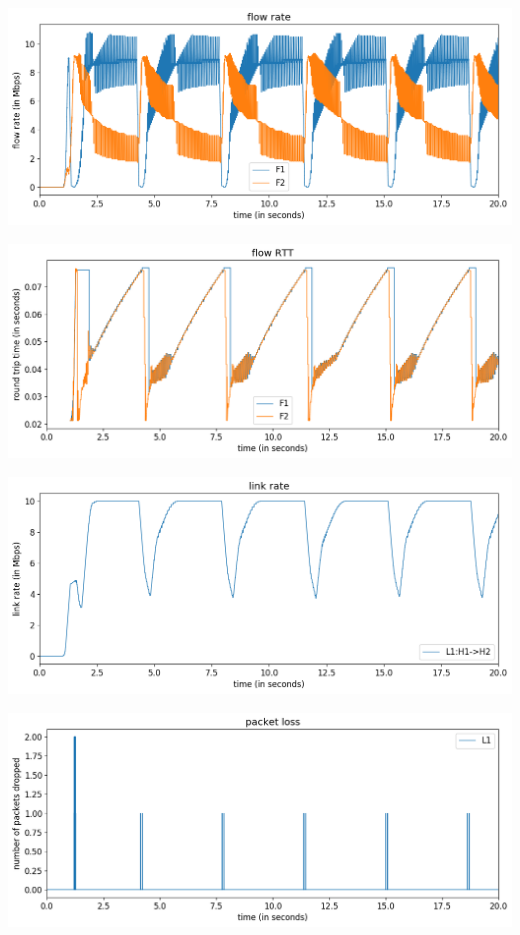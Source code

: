 \documentclass{article}
\begin{document}
\includegraphics[width = \textwidth]{"test_case3 flow rate"}

\includegraphics[width = \textwidth]{"test_case3 flow RTT"}

\includegraphics[width = \textwidth]{"test_case3 link rate"}

\includegraphics[width = \textwidth]{"test_case3 packet loss"}
\end{document}
